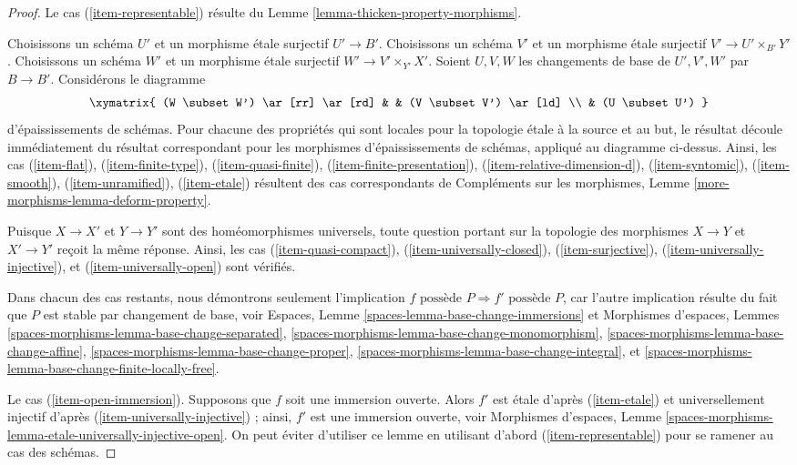 \begin{proof}
Le cas (\ref{item-representable}) résulte du
Lemme \ref{lemma-thicken-property-morphisms}.

\medskip\noindent
Choisissons un schéma $U'$ et un morphisme étale surjectif $U' \to B'$.
Choisissons un schéma $V'$ et un morphisme étale surjectif
$V' \to U' \times_{B'} Y'$.
Choisissons un schéma $W'$ et un morphisme étale surjectif
$W' \to V' \times_{Y'} X'$. Soient $U, V, W$ les changements de base
de $U', V', W'$ par $B \to B'$. Considérons le diagramme
$$
\xymatrix{
(W \subset W') \ar[rr] \ar[rd] & & (V \subset V') \ar[ld] \\
& (U \subset U')
}
$$
d'épaississements de schémas. Pour chacune des propriétés qui sont
locales pour la topologie étale à la source et au but, le résultat découle immédiatement
du résultat correspondant pour les morphismes d'épaississements de schémas,
appliqué au diagramme ci-dessus. Ainsi, les cas
(\ref{item-flat}), (\ref{item-finite-type}),
(\ref{item-quasi-finite}), (\ref{item-finite-presentation}),
(\ref{item-relative-dimension-d}), (\ref{item-syntomic}),
(\ref{item-smooth}), (\ref{item-unramified}), (\ref{item-etale})
résultent des cas correspondants de
Compléments sur les morphismes, Lemme \ref{more-morphisms-lemma-deform-property}.

\medskip\noindent
Puisque $X \to X'$ et $Y \to Y'$ sont des homéomorphismes universels,
toute question portant sur la topologie des morphismes
$X \to Y$ et $X' \to Y'$ reçoit la même réponse. Ainsi,
les cas (\ref{item-quasi-compact}), (\ref{item-universally-closed}),
(\ref{item-surjective}), (\ref{item-universally-injective}), et
(\ref{item-universally-open}) sont vérifiés.

\medskip\noindent
Dans chacun des cas restants, nous démontrons seulement l'implication
$f\text{ possède }P \Rightarrow f'\text{ possède }P$, car l'autre
implication résulte du fait que $P$ est stable par
changement de base, voir
Espaces, Lemme \ref{spaces-lemma-base-change-immersions} et
Morphismes d'espaces, Lemmes
\ref{spaces-morphisms-lemma-base-change-separated},
\ref{spaces-morphisms-lemma-base-change-monomorphism},
\ref{spaces-morphisms-lemma-base-change-affine},
\ref{spaces-morphisms-lemma-base-change-proper},
\ref{spaces-morphisms-lemma-base-change-integral}, et
\ref{spaces-morphisms-lemma-base-change-finite-locally-free}.

\medskip\noindent
Le cas (\ref{item-open-immersion}). Supposons que $f$ soit une immersion ouverte.
Alors $f'$ est étale d'après (\ref{item-etale}) et universellement injectif
d'après (\ref{item-universally-injective}) ;
ainsi, $f'$ est une immersion ouverte, voir
Morphismes d'espaces, Lemme
\ref{spaces-morphisms-lemma-etale-universally-injective-open}.
On peut éviter d'utiliser ce lemme en
utilisant d'abord (\ref{item-representable}) pour se ramener au cas des schémas.


\end{proof}
